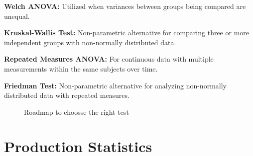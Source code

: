 \documentclass[
  a4paper,
]{scrbook}
\begin{document}
\textbf{Welch ANOVA:} Utilized when variances between groups being
compared are unequal.

\textbf{Kruskal-Wallis Test:} Non-parametric alternative for comparing
three or more independent groups with non-normally distributed data.

\textbf{Repeated Measures ANOVA:} For continuous data with multiple
measurements within the same subjects over time.

\textbf{Friedman Test:} Non-parametric alternative for analyzing
non-normally distributed data with repeated measures.

\begin{figure}[ht]


\caption{\label{fig-chs-tst}Roadmap to choosse the right test}

\end{figure}%


\chapter{Production Statistics}\label{production-statistics}
\end{document}
